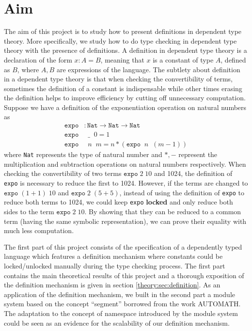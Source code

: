 \section{Aim}\label{chapter:intro:structure}
The aim of this project is to study how to present definitions in dependent type theory. More specifically, we study how to do type checking in dependent type theory with the presence of definitions. A definition in dependent type theory is a declaration of the form $x : A = B$, meaning that $x$ is a constant of type $A$, defined as $B$, where $A,B$ are expressions of the language. The subtlety about definition in a dependent type theory is that when checking the convertibility of terms, sometimes the definition of a constant is indispensable while other times erasing the definition helps to improve efficiency by cutting off unnecessary computation. Suppose we have a definition of the exponentiation operation on natural numbers as
\begin{align*}
  \texttt{expo} &: \texttt{Nat} \to \texttt{Nat} \to \texttt{Nat} \\
  \texttt{expo} &\;\; \_\;\; 0 = 1 \\
  \texttt{expo} &\;\; n \;\; m = n * (\texttt{expo} \;\; n \;\; (m - 1))
\end{align*}
where \texttt{Nat} represents the type of natural number and $*,-$ represent the multiplication and subtraction operations on natural numbers respectively. When checking the convertibility of two terms $\texttt{expo}\;2\;10$ and 1024, the definition of \texttt{expo} is necessary to reduce the first to 1024. However, if the terms are changed to $\texttt{expo}\;(1 + 1)\;10$ and $\texttt{expo}\;2\;(5+5)$, instead of using the definition of \texttt{expo} to reduce both terms to 1024, we could keep \texttt{expo} \textbf{locked} and only reduce both sides to the term $\texttt{expo}\;2\;10$. By showing that they can be reduced to a common term (having the same symbolic representation), we can prove their equality with much less computation.

The first part of this project consists of the specification of a dependently typed language which features a definition mechanism where constants could be locked/unlocked manually during the type checking process. The first part contains the main theoretical results of this project and a thorough exposition of the definition mechanism is given in section \ref{theory:sec:definition}. As an application of the definition mechanism, we built in the second part a module system based on the concept ``segment'' borrowed from the work AUTOMATH\cite{balsters1994lambda}. The adaptation to the concept of namespace introduced by the module system could be seen as an evidence for the scalability of our definition mechanism.

